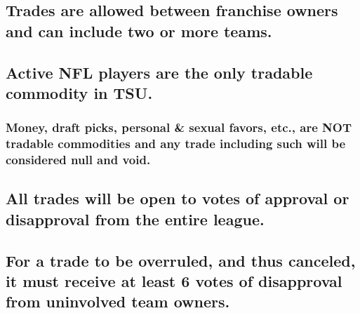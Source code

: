 \documentclass[
]{book}
\begin{document}
\hypertarget{trades-are-allowed-between-franchise-owners-and-can-include-two-or-more-teams.}{%
\subsection{Trades are allowed between franchise owners and can include two or more teams.}\label{trades-are-allowed-between-franchise-owners-and-can-include-two-or-more-teams.}}

\hypertarget{active-nfl-players-are-the-only-tradable-commodity-in-tsu.}{%
\subsection{Active NFL players are the only tradable commodity in TSU.}\label{active-nfl-players-are-the-only-tradable-commodity-in-tsu.}}

\hypertarget{money-draft-picks-personal-sexual-favors-etc.-are-not-tradable-commodities-and-any-trade-including-such-will-be-considered-null-and-void.}{%
\subsubsection{Money, draft picks, personal \& sexual favors, etc., are NOT tradable commodities and any trade including such will be considered null and void.}\label{money-draft-picks-personal-sexual-favors-etc.-are-not-tradable-commodities-and-any-trade-including-such-will-be-considered-null-and-void.}}

\hypertarget{all-trades-will-be-open-to-votes-of-approval-or-disapproval-from-the-entire-league.}{%
\subsection{All trades will be open to votes of approval or disapproval from the entire league.}\label{all-trades-will-be-open-to-votes-of-approval-or-disapproval-from-the-entire-league.}}

\hypertarget{for-a-trade-to-be-overruled-and-thus-canceled-it-must-receive-at-least-6-votes-of-disapproval-from-uninvolved-team-owners.}{%
\subsection{For a trade to be overruled, and thus canceled, it must receive at least 6 votes of disapproval from uninvolved team owners.}\label{for-a-trade-to-be-overruled-and-thus-canceled-it-must-receive-at-least-6-votes-of-disapproval-from-uninvolved-team-owners.}}
\end{document}
